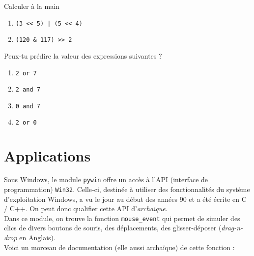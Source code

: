 \documentclass[a4paper,10pt,cours,firamath]{nsi}
\begin{document}
\begin{exercice}[]
	Calculer à la main
	\begin{enumerate}
		\item 	\texttt{(3 << 5) | (5 << 4) }
		\item 	\texttt{(120 \& 117) >> 2}
	\end{enumerate}
\end{exercice}

\begin{exercice}
	Peux-tu prédire la valeur des expressions suivantes ?
	\begin{enumerate}
		\item 	\texttt{2 or 7}
		\item 	\texttt{2 and 7}
		\item 	\texttt{0 and 7}
		\item 	\texttt{2 or 0}
	\end{enumerate}
\end{exercice}

\section{Applications}

Sous Windows, le module \texttt{pywin} offre un accès à l'API (interface de programmation) \texttt{Win32}. Celle-ci, destinée à utiliser des fonctionnalités du système d'exploitation Windows, a vu le jour au début des années 90 et a été écrite en \textsc{C} / \textsc{C++}. On peut donc qualifier cette API d'\textit{archaïque}.\\
Dans ce module, on trouve la fonction \texttt{mouse\_event} qui permet de simuler des clics de divers boutons de souris, des déplacements, des glisser-déposer (\textit{drag-n-drop} en Anglais).\\
Voici un morceau de documentation (elle aussi archaïque) de cette fonction :\\
\end{document}
